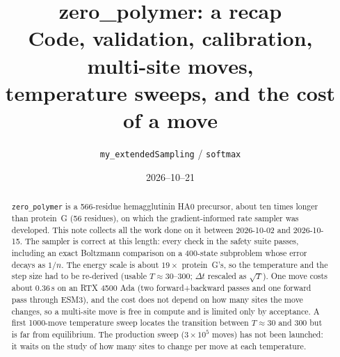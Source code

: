 \documentclass[11pt,a4paper]{article}
\title{zero\_polymer: a recap\\
       \large Code, validation, calibration, multi-site moves,\\
       temperature sweeps, and the cost of a move}
\author{\texttt{my\_extendedSampling} / \texttt{softmax}}
\date{2026--10--21}
\newcommand{\dt}{\Delta t}
\begin{document}
\maketitle

\begin{abstract}
\noindent
\texttt{zero\_polymer} is a 566-residue hemagglutinin HA0 precursor, about ten
times longer than protein~G (56 residues), on which the gradient-informed rate
sampler was developed. This note collects all the work done on it between
2026-10-02 and 2026-10-15. The sampler is correct at this length: every check
in the safety suite passes, including an exact Boltzmann comparison on a
400-state subproblem whose error decays as $1/n$. The energy scale is about
$19\times$ protein~G's, so the temperature and the step size had to be
re-derived (usable $T\approx 30$--$300$; $\dt$ rescaled as $\sqrt{T}$). One move
costs about $0.36$\,s on an RTX 4500 Ada (two forward+backward passes and one forward
pass through ESM3), and the cost does not depend on how many sites the move
changes, so a multi-site move is free in compute and is limited only by
acceptance. A first 1000-move temperature sweep locates the transition between
$T\approx 30$ and $300$ but is far from equilibrium. The production sweep
($3\times10^5$ moves) has not been launched: it waits on the study of how many
sites to change per move at each temperature.
\end{abstract}

\tableofcontents

\end{document}
